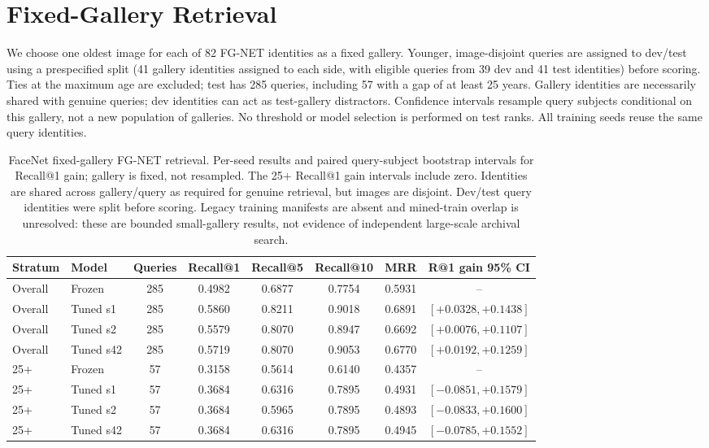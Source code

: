 \documentclass[journal]{IEEEtran}
\begin{document}
\section{Fixed-Gallery Retrieval}\label{sec:supp-retrieval}
We choose one oldest image for each of 82 FG-NET identities as a fixed gallery. Younger,
image-disjoint queries are assigned to dev/test using a prespecified split (41 gallery identities
assigned to each side, with eligible queries from 39 dev and 41 test identities) before scoring.
Ties at the maximum age are excluded; test has 285 queries, including
57 with a gap of at least 25 years. Gallery identities are necessarily shared with genuine queries;
dev identities can act as test-gallery distractors. Confidence intervals resample query subjects
conditional on this gallery, not a new population of galleries. No threshold or model selection is
performed on test ranks. All training seeds reuse the same query identities.

\begin{table}[!t]
\caption{FaceNet fixed-gallery FG-NET retrieval. Per-seed results and paired query-subject bootstrap intervals for Recall@1 gain; gallery is fixed, not resampled. The 25+ Recall@1 gain intervals include zero. Identities are shared across gallery/query as required for genuine retrieval, but images are disjoint. Dev/test query identities were split before scoring. Legacy training manifests are absent and mined-train overlap is unresolved: these are bounded small-gallery results, not evidence of independent large-scale archival search.}
\label{tab:fgnet-retrieval}
\centering\footnotesize
\begin{tabular}{@{}llccccc c@{}}
\toprule
Stratum & Model & Queries & Recall@1 & Recall@5 & Recall@10 & MRR & R@1 gain 95\% CI \\
\midrule
Overall & Frozen & 285 & 0.4982 & 0.6877 & 0.7754 & 0.5931 & -- \\
Overall & Tuned s1 & 285 & 0.5860 & 0.8211 & 0.9018 & 0.6891 & $[+0.0328,+0.1438]$ \\
Overall & Tuned s2 & 285 & 0.5579 & 0.8070 & 0.8947 & 0.6692 & $[+0.0076,+0.1107]$ \\
Overall & Tuned s42 & 285 & 0.5719 & 0.8070 & 0.9053 & 0.6770 & $[+0.0192,+0.1259]$ \\
25+ & Frozen & 57 & 0.3158 & 0.5614 & 0.6140 & 0.4357 & -- \\
25+ & Tuned s1 & 57 & 0.3684 & 0.6316 & 0.7895 & 0.4931 & $[-0.0851,+0.1579]$ \\
25+ & Tuned s2 & 57 & 0.3684 & 0.5965 & 0.7895 & 0.4893 & $[-0.0833,+0.1600]$ \\
25+ & Tuned s42 & 57 & 0.3684 & 0.6316 & 0.7895 & 0.4945 & $[-0.0785,+0.1552]$ \\
\bottomrule
\end{tabular}
\end{table}
\end{document}
